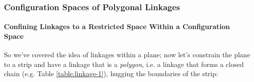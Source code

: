 \subsubsection{Configuration Spaces of Polygonal Linkages}




















\paragraph{Confining Linkages to a Restricted Space Within a Configuration Space}
So we've covered the idea of linkages within a plane; now let's constrain the plane to a strip and have a linkage that is a \textit{polygon}, i.e. a linkage that forms a closed chain (e.g. Table \ref{table:linkage-1}), hugging the boundaries of the strip:
